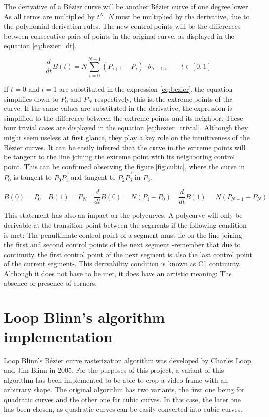 \documentclass[\topdir/main.tex]{subfiles}
\begin{document}
The derivative of a Bézier curve will be another Bézier curve of one degree lower. As all terms are multiplied by $t^N$, $N$ must be multiplied by the derivative, due to the polynomial derivation rules. The new control points will be the differences between consecutive pairs of points in the original curve, as displayed in the equation \eqref{eq:bezier_dt}.

\begin{equation} \label{eq:bezier_dt}
    \frac{d}{dt} B(t) = N \sum_{i = 0}^{N-1} (P_{i+1} - P_i) \cdot b_{N-1,i} \qquad t \in [0, 1]
\end{equation}

If $t=0$ and $t=1$ are substituted in the expression \eqref{eq:bezier}, the equation simplifies down to $P_0$ and $P_N$ respectively, this is, the extreme points of the curve. If the same values are substituted in the derivative, the expression is simplified to the difference between the extreme points and its neighbor. These four trivial cases are displayed in the equation \eqref{eq:bezier_trivial}. Although they might seem useless at first glance, they play a key role on the intuitiveness of the Bézier curves. It can be easily inferred that the curve in the extreme points will be tangent to the line joining the extreme point with its neighboring control point. This can be confirmed observing the figure \ref{fig:cubic}, where the curve in $P_0$ is tangent to $\overrightarrow{P_0P_1}$ and tangent to $\overrightarrow{P_2P_3}$ in $P_3$.\newline

\begin{equation} \label{eq:bezier_trivial}
    B(0) = P_0 \quad B(1) = P_N \quad \frac{d}{dt} B(0) = N(P_1 - P_0) \quad \frac{d}{dt} B(1) = N(P_{N-1} - P_N)
\end{equation}

This statement has also an impact on the polycurves. A polycurve will only be derivable at the transition point between the segments if the following condition is met: The penultimate control point of a segment must lie on the line joining the first and second control points of the next segment -remember that due to continuity, the first control point of the next segment is also the last control point of the current segment-. This derivability condition is known as C1 continuity. Although it does not have to be met, it does have an artistic meaning: The absence or presence of corners.

\section{Loop Blinn's algorithm implementation}
Loop Blinn's Bézier curve rasterization algorithm was developed by Charles Loop and Jim Blinn in 2005. For the purposes of this project, a variant of this algorithm has been implemented to be able to crop a video frame with an arbitrary shape. The original algorithm has two variants, the first one being for quadratic curves and the other one for cubic curves. In this case, the later one has been chosen, as quadratic curves can be easily converted into cubic curves.
\end{document}
